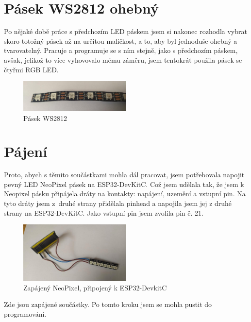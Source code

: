 \newpage

\section{Pásek WS2812 ohebný}
Po nějaké době práce s předchozím LED páskem jsem si nakonec rozhodla vybrat skoro totožný pásek až na určitou maličkost, a to, aby byl jednoduše ohebný a tvarovatelný. Pracuje a programuje se s ním stejně, jako s předchozím páskem, avšak, jelikož to více vyhovovalo mému záměru, jsem tentokrát použila pásek se čtyřmi RGB LED.\cite{Ohebny}

\begin{figure}[htbp]
	\centering
	\includegraphics[width=0.5\textwidth]{img/OhebnyLedPasek2.jpg}
	\caption{Pásek WS2812}
\end{figure}


\section{Pájení}

Proto, abych s těmito součástkami mohla dál pracovat, jsem potřebovala napojit pevný LED NeoPixel pásek na ESP32-DevKitC. Což jsem udělala tak, že jsem k Neopixel pásku připájela dráty na kontakty: napájení, uzemění a vstupní pin. Na tyto dráty jsem z~druhé strany přidělala pinhead a napojila jsem jej z druhé strany na ESP32-DevKitC. Jako vstupní pin jsem zvolila pin č. 21.  

\begin{figure}[htbp]
	\centering
	\includegraphics[width=0.5\textwidth]{img/Zapájené2.jpg}
	\caption{Zapájený NeoPixel, připojený k ESP32-DevkitC}
\end{figure}


Zde jsou zapájené součástky. Po tomto kroku jsem se mohla pustit do programování.

